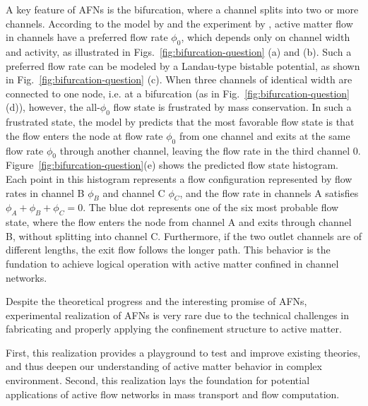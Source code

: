 \documentclass[%
10pt,
superscriptaddress,
twocolumn,
 amsmath,amssymb,
 aps,prx,
]{revtex4-2}
\begin{document}
A key feature of AFNs is the bifurcation, where a channel splits into two or more channels. 
According to the model by \citet{Woodhouse2017} and the experiment by \citet{Morin2018}, active matter flow in channels have a preferred flow rate $\phi_0$, which depends only on channel width and activity, as illustrated in Figs.~\ref{fig:bifurcation-question} (a) and (b).
Such a preferred flow rate can be modeled by a Landau-type bistable potential, as shown in Fig.~\ref{fig:bifurcation-question} (c).
When three channels of identical width are connected to one node, i.e. at a bifurcation (as in Fig.~\ref{fig:bifurcation-question}(d)), however, the all-$\phi_0$ flow state is frustrated by mass conservation.
In such a frustrated state, the model by \citet{Woodhouse2017} predicts that the most favorable flow state is that the flow enters the node at flow rate $\phi_0$ from one channel and exits at the same flow rate $\phi_0$ through another channel, leaving the flow rate in the third channel $0$.
Figure~\ref{fig:bifurcation-question}(e) shows the predicted flow state histogram.
Each point in this histogram represents a flow configuration represented by flow rates in channel B $\phi_B$ and channel C $\phi_C$, and the flow rate in channels A satisfies $\phi_A+\phi_B+\phi_C=0$.
The blue dot represents one of the six most probable flow state, where the flow enters the node from channel A and exits through channel B, without splitting into channel C.
Furthermore, if the two outlet channels are of different lengths, the exit flow follows the longer path.  
This behavior is the fundation to achieve logical operation with active matter confined in channel networks. 

Despite the theoretical progress and the interesting promise of AFNs, experimental realization of AFNs is very rare due to the technical challenges in fabricating and properly applying the confinement structure to active matter.

First, this realization provides a playground to test and improve existing theories, and thus deepen our understanding of active matter behavior in complex environment. 
Second, this realization lays the foundation for potential applications of active flow networks in mass transport and flow computation. 
\end{document}
